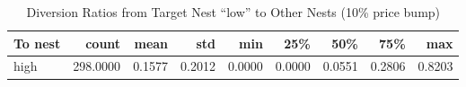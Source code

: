 \begin{table}[!htbp]
\centering
\caption{Diversion Ratios from Target Nest “low” to Other Nests (10\% price bump)}
\label{tab:diversion_nests}
\begin{tabular}{lrrrrrrrr}
\toprule
To nest & count & mean & std & min & 25\% & 50\% & 75\% & max \\
\midrule
high & 298.0000 & 0.1577 & 0.2012 & 0.0000 & 0.0000 & 0.0551 & 0.2806 & 0.8203 \\
\bottomrule
\end{tabular}

\end{table}
